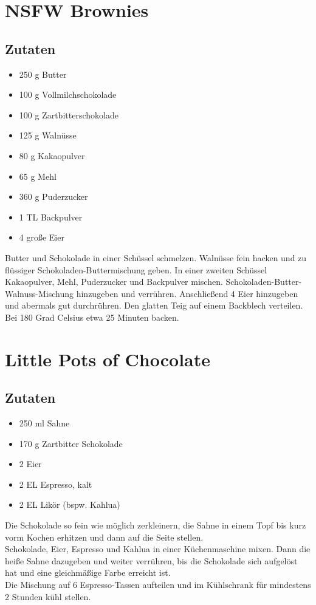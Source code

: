 \documentclass{article}
\begin{document}
\section{NSFW Brownies}
\subsection*{Zutaten}	
	\begin{itemize}
		\item 250 g Butter
		\item 100 g Vollmilchschokolade
		\item 100 g Zartbitterschokolade
		\item 125 g Walnüsse
		\item 80 g Kakaopulver
		\item 65 g Mehl
		\item 360 g Puderzucker
		\item 1 TL Backpulver
		\item 4 große Eier
	\end{itemize}
	Butter und Schokolade in einer Schüssel schmelzen.
	Walnüsse fein hacken und zu flüssiger Schokoladen-Buttermischung geben.
	In einer zweiten Schüssel Kakaopulver, Mehl, Puderzucker und Backpulver mischen.
	Schokoladen-Butter-Walnuss-Mischung hinzugeben und verrühren.
	Anschließend 4 Eier hinzugeben und abermals gut durchrühren.
	Den glatten Teig auf einem Backblech verteilen.\\
	Bei 180 Grad Celsius etwa 25 Minuten backen.

\section{Little Pots of Chocolate}
\subsection*{Zutaten}
	\begin{itemize}
		\item 250 ml Sahne
		\item 170 g Zartbitter Schokolade
		\item 2 Eier
		\item 2 EL Espresso, kalt
		\item 2 EL Likör (bspw. Kahlua)
	\end{itemize}
	Die Schokolade so fein wie möglich zerkleinern,
	die Sahne in einem Topf bis kurz vorm Kochen erhitzen und dann auf die Seite stellen.\\
	Schokolade, Eier, Espresso und Kahlua in einer Küchenmaschine mixen. 
	Dann die heiße Sahne dazugeben und weiter verrühren,
	bis die Schokolade sich aufgelöst hat und eine gleichmäßige Farbe erreicht ist. \\
	Die Mischung auf 6 Espresso-Tassen aufteilen und im Kühlschrank für mindestens 2 Stunden kühl stellen.
\end{document}

